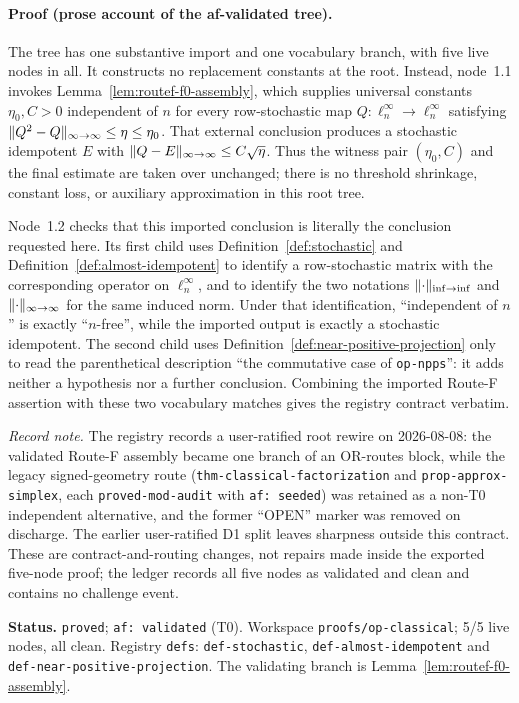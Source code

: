 \paragraph{Proof (prose account of the af-validated tree).}
The tree has one substantive import and one vocabulary branch, with five live nodes in
all.  It constructs no replacement constants at the root.  Instead, node~1.1 invokes
Lemma~\ref{lem:routef-f0-assembly}, which supplies universal constants
$\eta_{0},C>0$ independent of $n$ for every row-stochastic map
$Q:\ell^{\infty}_{n}\to\ell^{\infty}_{n}$ satisfying
$\lVert Q^{2}-Q\rVert_{\infty\to\infty}\le\eta\le\eta_{0}$.  That external conclusion
produces a stochastic idempotent $E$ with
$\lVert Q-E\rVert_{\infty\to\infty}\le C\sqrt{\eta}$.  Thus the witness pair
$(\eta_{0},C)$ and the final estimate are taken over unchanged; there is no threshold
shrinkage, constant loss, or auxiliary approximation in this root tree.

Node~1.2 checks that this imported conclusion is literally the conclusion requested here.
Its first child uses Definition~\ref{def:stochastic} and
Definition~\ref{def:almost-idempotent} to identify a row-stochastic matrix with the
corresponding operator on $\ell^{\infty}_{n}$, and to identify the two notations
$\lVert \cdot\rVert_{\mathrm{inf}\to\mathrm{inf}}$ and
$\lVert \cdot\rVert_{\infty\to\infty}$ for the same induced norm.  Under that identification,
``independent of $n$'' is exactly ``$n$-free'', while the imported output is exactly a
stochastic idempotent.  The second child uses
Definition~\ref{def:near-positive-projection} only to read the parenthetical description
``the commutative case of \texttt{op-npps}'': it adds neither a hypothesis nor a further
conclusion.  Combining the imported Route-F assertion with these two vocabulary matches
gives the registry contract verbatim.

\emph{Record note.} The registry records a user-ratified root rewire on 2026-08-08: the
validated Route-F assembly became one branch of an OR-routes block, while the legacy
signed-geometry route (\texttt{thm-classical-factorization} and \texttt{prop-approx-simplex}, each \texttt{proved-mod-audit} with \texttt{af: seeded}) was retained as a non-T0 independent alternative, and the former
``OPEN'' marker was removed on discharge.  The earlier user-ratified D1 split leaves
sharpness outside this contract.  These are contract-and-routing changes, not repairs made
inside the exported five-node proof; the ledger records all five nodes as validated and
clean and contains no challenge event.

\medskip
\noindent\textbf{Status.} \texttt{proved}; \texttt{af: validated} (T0).  Workspace
\texttt{proofs/op-classical}; 5/5 live nodes, all clean.  Registry \texttt{defs}:
\texttt{def-stochastic}, \texttt{def-almost-idempotent} and
\texttt{def-near-positive-projection}.  The validating branch is
Lemma~\ref{lem:routef-f0-assembly}.
